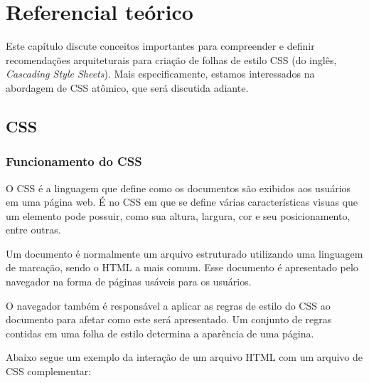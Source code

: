 \newpage

\hypertarget{referencial-teuxf3rico}{%
\chapter{Referencial teórico}\label{referencial-teuxf3rico}}

Este capítulo discute conceitos importantes para compreender e definir
recomendações arquiteturais para criação de folhas de estilo CSS (do
inglês, \emph{Cascading Style Sheets}). Mais especificamente, estamos
interessados na abordagem de CSS atômico, que será discutida adiante.

\hypertarget{css}{%
\section{CSS}\label{css}}

\hypertarget{funcionamento-do-css}{%
\subsection{Funcionamento do CSS}\label{funcionamento-do-css}}

O CSS é a linguagem que define como os documentos são exibidos aos
usuários em uma página web. É no CSS em que se define várias
características visuas que um elemento pode possuir, como sua altura,
largura, cor e seu posicionamento, entre outras.\nocite{howcssworks}

Um documento é normalmente um arquivo estruturado utilizando uma
linguagem de marcação, sendo o HTML a mais comum. Esse documento é
apresentado pelo navegador na forma de páginas usáveis para os usuários.

O navegador também é responsável a aplicar as regras de estilo do CSS ao
documento para afetar como este será apresentado. Um conjunto de regras
contidas em uma folha de estilo determina a aparência de uma página.

Abaixo segue um exemplo da interação de um arquivo HTML com um arquivo
de CSS complementar:

\begin{Shaded}
\begin{Highlighting}[]
\DataTypeTok{>}
    \KeywordTok{>}
    \KeywordTok{>}
\end{Highlighting}
\end{Shaded}

